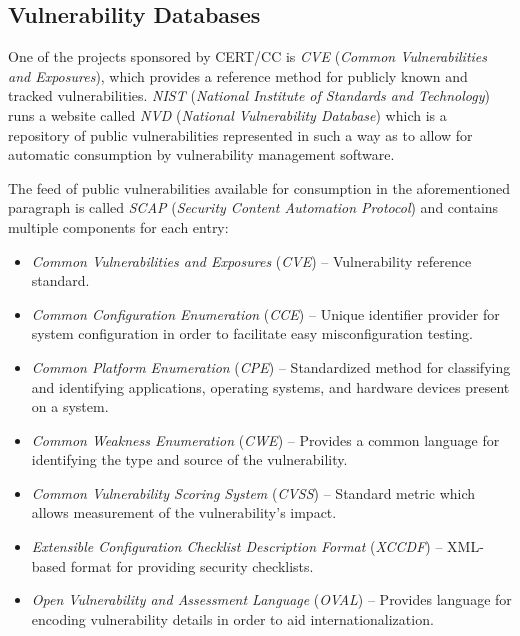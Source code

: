 \documentclass[a4paper,12pt]{article}
\begin{document}
\subsection{Vulnerability Databases} \label{vulndbs}
 
	
	One of the projects sponsored by CERT/CC is \textit{CVE} (\textit{Common Vulnerabilities and Exposures}), which provides a reference method for publicly known and tracked vulnerabilities. \textit{NIST} (\textit{National Institute of Standards and Technology}) runs a website called \textit{NVD} (\textit{National Vulnerability Database}) which is a repository of public vulnerabilities represented in such a way as to allow for automatic consumption by vulnerability management software\cite{nvd15}.
	
	The feed of public vulnerabilities available for consumption in the aforementioned paragraph is called \textit{SCAP} (\textit{Security Content Automation Protocol}) and contains multiple components for each entry:
	
	\begin{itemize}
		\item \textit{Common Vulnerabilities and Exposures} (\textit{CVE}) -- Vulnerability reference standard.
		\item \textit{Common Configuration Enumeration} (\textit{CCE}) -- Unique identifier provider for system configuration in order to facilitate easy misconfiguration testing.
		\item \textit{Common Platform Enumeration} (\textit{CPE}) -- Standardized method for classifying and identifying applications, operating systems, and hardware devices present on a system.
		\item \textit{Common Weakness Enumeration} (\textit{CWE}) -- Provides a common language for identifying the type and source of the vulnerability.
		\item \textit{Common Vulnerability Scoring System} (\textit{CVSS}) -- Standard metric which allows measurement of the vulnerability's impact.
		\item \textit{Extensible Configuration Checklist Description Format} (\textit{XCCDF}) -- XML-based format for providing security checklists.
		\item \textit{Open Vulnerability and Assessment Language} (\textit{OVAL}) -- Provides language for encoding vulnerability details in order to aid internationalization.
	\end{itemize}
	
\end{document}

